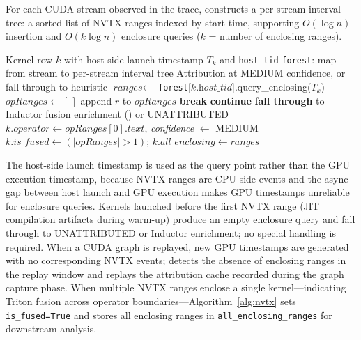 For each CUDA stream observed in the \nsys trace, \sys
constructs a per-stream interval tree: a sorted list of NVTX ranges indexed by start time,
supporting $O(\log n)$ insertion and $O(k \log n)$ enclosure queries ($k$ = number of enclosing ranges).

\begin{algorithm}[t]
\caption{NVTX Enclosure Attribution (MEDIUM Confidence)}
\label{alg:nvtx}
\begin{algorithmic}[1]
\Require Kernel row $k$ with host-side launch timestamp $T_k$ and \texttt{host\_tid}
\Require \texttt{forest}: map from stream to per-stream interval tree
\Ensure Attribution at MEDIUM confidence, or fall through to heuristic
\State $\textit{ranges} \gets$ \texttt{forest}[$k.\textit{host\_tid}$].query\_enclosing($T_k$)
\State $\textit{opRanges} \gets [\,]$
    \State append $r$ to $\textit{opRanges}$
    \State \textbf{break}
  \Else
    \State \textbf{continue}
  \EndIf
\EndFor
{}
  \State \textbf{fall through} to Inductor fusion enrichment () or UNATTRIBUTED
\Else
  \State $k.\textit{operator} \gets \textit{opRanges}[0].\textit{text}$,
         \textit{confidence} $\gets$ MEDIUM
  \State $k.\textit{is\_fused} \gets (|\textit{opRanges}| > 1)$;
         $k.\textit{all\_enclosing} \gets \textit{ranges}$
\EndIf
\end{algorithmic}
\end{algorithm}

The host-side launch timestamp is used as the query point rather than the GPU execution timestamp,
because NVTX ranges are CPU-side events and the async gap between host launch
and GPU execution makes GPU timestamps unreliable for enclosure queries.
Kernels launched before the first NVTX range (JIT compilation artifacts during warm-up)
produce an empty enclosure query and fall through to UNATTRIBUTED or Inductor enrichment;
no special handling is required.  When a CUDA graph is replayed, new GPU timestamps are
generated with no corresponding NVTX events; \sys detects the absence of enclosing ranges
in the replay window and replays the attribution cache recorded during the graph capture phase.
When multiple NVTX ranges enclose a single kernel---indicating Triton fusion across operator
boundaries---Algorithm~\ref{alg:nvtx} sets \texttt{is\_fused=True} and stores all enclosing
ranges in \texttt{all\_enclosing\_ranges} for downstream analysis.

